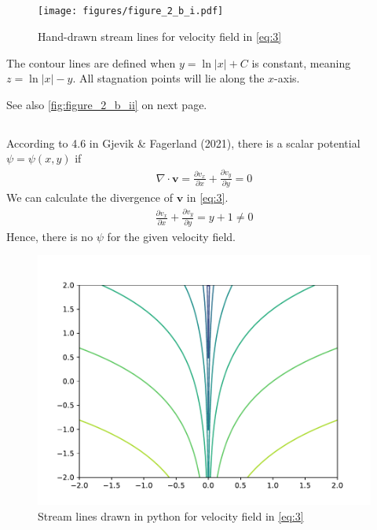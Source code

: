 \documentclass[a4paper,10pt,english]{article}
\begin{document}
\newpage
\subsection{}
\begin{figure}[h]
    \centering
    \texttt{[image: figures/figure\_2\_b\_i.pdf]}
    \caption{Hand-drawn stream lines for velocity field in \eqref{eq:3}}
    \label{fig:figure_2_b_i}
\end{figure}
The contour lines are defined when $y = \ln|x| + C$ is constant, meaning $z = \ln|x| - y$. All stagnation points will lie along the $x$-axis. 



See also \autoref{fig:figure_2_b_ii}  on next page.

\subsection{}
According to 4.6 in Gjevik \& Fagerland (2021), there is a scalar potential $\psi=\psi(x, y)$ if 
\begin{align}
    \nabla \cdot \bm{v} 
    = \frac{\partial v_x}{\partial x} + \frac{\partial v_y}{\partial y}
    = 0
\end{align}
We can calculate the divergence of $\bm{v}$ in \eqref{eq:3}.
\begin{align*}
    \frac{\partial v_x}{\partial x} + \frac{\partial v_y}{\partial y}
    = y + 1 \neq 0
\end{align*}
Hence, there is no $\psi$ for the given velocity field. 

\begin{figure}[h]
    \centering
    \includegraphics[scale=0.7]{figures/figure_2_b_ii.pdf}
    \caption{Stream lines drawn in python for velocity field in \eqref{eq:3}}
    \label{fig:figure_2_b_ii}
\end{figure}
\end{document}
